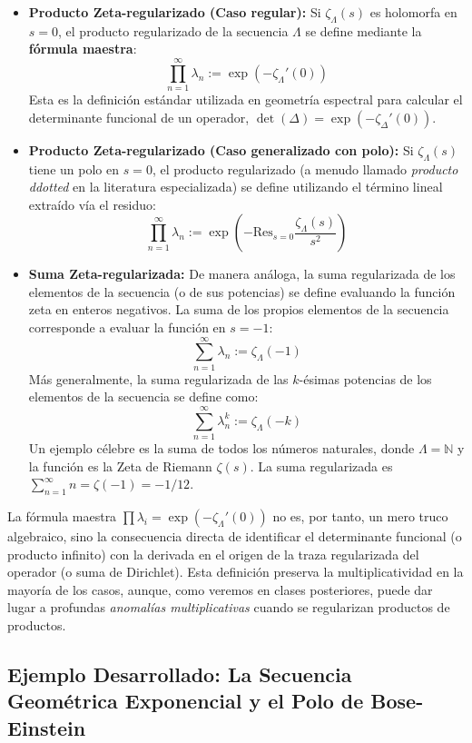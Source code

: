\begin{itemize}
    \item \textbf{Producto Zeta-regularizado (Caso regular):} Si $\zeta_\Lambda(s)$ es holomorfa en $s=0$, el producto regularizado de la secuencia $\Lambda$ se define mediante la \textbf{fórmula maestra}:
    $$ \prod_{n=1}^{\infty} \lambda_n := \exp(-\zeta_\Lambda'(0)) $$
    Esta es la definición estándar utilizada en geometría espectral para calcular el determinante funcional de un operador, $\det(\Delta) = \exp(-\zeta_\Delta'(0))$.

    \item \textbf{Producto Zeta-regularizado (Caso generalizado con polo):} Si $\zeta_\Lambda(s)$ tiene un polo en $s=0$, el producto regularizado (a menudo llamado \textit{producto ddotted} en la literatura especializada) se define utilizando el término lineal extraído vía el residuo:
    $$ \prod_{n=1}^{\infty} \lambda_n := \exp\left( -\text{Res}_{s=0} \frac{\zeta_\Lambda(s)}{s^2} \right) $$

    \item \textbf{Suma Zeta-regularizada:} De manera análoga, la suma regularizada de los elementos de la secuencia (o de sus potencias) se define evaluando la función zeta en enteros negativos. La suma de los propios elementos de la secuencia corresponde a evaluar la función en $s = -1$:
    $$ \sum_{n=1}^{\infty} \lambda_n := \zeta_\Lambda(-1) $$
    Más generalmente, la suma regularizada de las $k$-ésimas potencias de los elementos de la secuencia se define como:
    $$ \sum_{n=1}^{\infty} \lambda_n^k := \zeta_\Lambda(-k) $$
    Un ejemplo célebre es la suma de todos los números naturales, donde $\Lambda = \mathbb{N}$ y la función es la Zeta de Riemann $\zeta(s)$. La suma regularizada es $\sum_{n=1}^\infty n = \zeta(-1) = -1/12$.
\end{itemize}

La fórmula maestra $\prod \lambda_i = \exp(-\zeta_\Lambda'(0))$ no es, por tanto, un mero truco algebraico, sino la consecuencia directa de identificar el determinante funcional (o producto infinito) con la derivada en el origen de la traza regularizada del operador (o suma de Dirichlet). Esta definición preserva la multiplicatividad en la mayoría de los casos, aunque, como veremos en clases posteriores, puede dar lugar a profundas \textit{anomalías multiplicativas} cuando se regularizan productos de productos.


\subsection{Ejemplo Desarrollado: La Secuencia Geométrica Exponencial y el Polo de Bose-Einstein}

